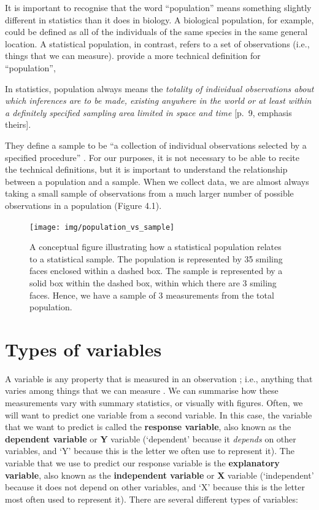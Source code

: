 \documentclass[
  openany]{krantz}
\renewenvironment{quote}{\begin{VF}}{\end{VF}}
\begin{document}
It is important to recognise that the word ``population'' means something slightly different in statistics than it does in biology.
A biological population, for example, could be defined as all of the individuals of the same species in the same general location.
A statistical population, in contrast, refers to a set of observations (i.e., things that we can measure).
\citet{Sokal1995} provide a more technical definition for ``population'',

\begin{quote}
In statistics, population always means the \emph{totality of individual observations about which inferences are to be made, existing anywhere in the world or at least within a definitely specified sampling area limited in space and time} {[}p.~9, emphasis theirs{]}.
\end{quote}

They define a sample to be ``a collection of individual observations selected by a specified procedure'' \citep{Sokal1995}.
For our purposes, it is not necessary to be able to recite the technical definitions, but it is important to understand the relationship between a population and a sample.
When we collect data, we are almost always taking a small sample of observations from a much larger number of possible observations in a population (Figure 4.1).

\begin{figure}
\texttt{[image: img/population\_vs\_sample]} \caption{A conceptual figure illustrating how a statistical population relates to a statistical sample. The population is represented by 35 smiling faces enclosed within a dashed box. The sample is represented by a solid box within the dashed box, within which there are 3 smiling faces. Hence, we have a sample of 3 measurements from the total population.}\label{fig:unnamed-chunk-21}
\end{figure}

\hypertarget{Chapter_5}{%
\chapter{Types of variables}\label{Chapter_5}}

A variable is any property that is measured in an observation \citep{Sokal1995}; i.e., anything that varies among things that we can measure \citep{Dytham2011}.
We can summarise how these measurements vary with summary statistics, or visually with figures.
Often, we will want to predict one variable from a second variable.
In this case, the variable that we want to predict is called the \textbf{response variable}, also known as the \textbf{dependent variable} or \textbf{Y} variable (`dependent' because it \emph{depends} on other variables, and `Y' because this is the letter we often use to represent it).
The variable that we use to predict our response variable is the \textbf{explanatory variable}, also known as the \textbf{independent variable} or \textbf{X} variable (`independent' because it does not depend on other variables, and `X' because this is the letter most often used to represent it).
There are several different types of variables:
\end{document}
